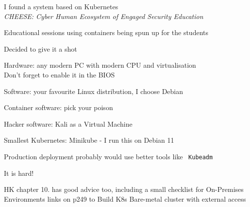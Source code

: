 \documentclass[Screen16to9,17pt]{foils}
\begin{document}
\begin{list2}
\item I found a system based on Kubernetes \\
\emph{CHEESE: Cyber Human Ecosystem of Engaged Security Education}\\
\item Educational sessions using containers being spun up for the students
\item Decided to give it a shot
\end{list2}




\begin{list2}
\item Hardware: any modern PC with modern CPU and virtualisation\\
Don't forget to enable it in the BIOS
\item Software: your favourite Linux distribution, I choose Debian
\item Container software: pick your poison
\item Hacker software: Kali as a Virtual Machine 
\item Smallest Kubernetes: Minikube -  I run this on Debian 11
\item Production deployment probably would use better tools like \faWrench\ \verb+Kubeadm+
\end{list2}





\begin{list2}
\item It is hard!


\item HK chapter 10. has good advice too, including a small checklist for On-Premises Environments
links on p249 to Build K8s Bare-metal cluster with external access\\
\\
\\
\end{list2}
\end{document}

